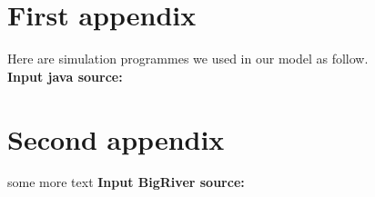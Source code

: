 \begin{appendices}
	
	\section{First appendix}
	
	Here are simulation programmes we used in our model as follow.\\
	
	\textbf{\textcolor[rgb]{0.98,0.00,0.00}{Input java source:}}
	

	\section{Second appendix}
	
	some more text \textcolor[rgb]{0.98,0.00,0.00}{\textbf{Input BigRiver source:}}
	
	
\end{appendices}
